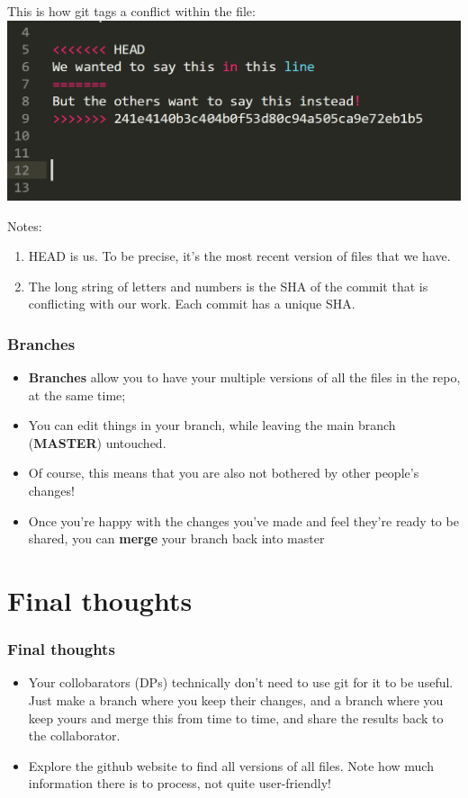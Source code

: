\documentclass{beamer}
\begin{document}
\begin{frame}
This is how git tags a conflict within the file:
\hfill\includegraphics[width=1\linewidth]{figures/conflict.png}\hfill\strut
Notes:
\begin{enumerate}
	\item HEAD is us. To be precise, it's the most recent version of files that we have.
	\item The long string of letters and numbers is the SHA of the commit that is conflicting with our work. Each commit has a unique SHA.
\end{enumerate}
\end{frame}


\begin{frame}
	\frametitle{Branches}
	\begin{itemize}
		\item \textbf{Branches} allow you to have your multiple versions of all the files in the repo, at the same time;
		\item You can edit things in your branch, while leaving the main branch (\textbf{MASTER}) untouched.
		\item Of course, this means that you are also not bothered by other people's changes!
		\item Once you're happy with the changes you've made and feel they're ready to be shared, you can \textbf{merge} your branch back into master
	\end{itemize}
\end{frame}

\section{Final thoughts}
\begin{frame}
	\frametitle{Final thoughts}
	\begin{itemize}
		\item Your collobarators (DPs) technically don't need to use git for it to be useful. Just make a branch where you keep their changes, and a branch where 
				you keep yours and merge this from time to time, and share the results back to the collaborator.
		\item Explore the github website to find all versions of all files. Note how much information there is to process, not quite user-friendly!
	\end{itemize}
\end{frame}
\end{document}
